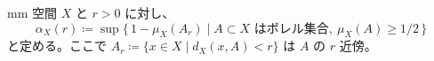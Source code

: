 mm 空間 $X$ と $r > 0$ に対し、
\[
  \alpha_X(r) \coloneqq \sup\{\, 1 - \mu_X(A_r) \mid A \subset X \text{ はボレル集合},\ \mu_X(A) \ge 1/2 \,\}
\]
と定める。ここで $A_r \coloneqq \{x \in X \mid d_X(x, A) < r\}$ は $A$ の $r$ 近傍。
